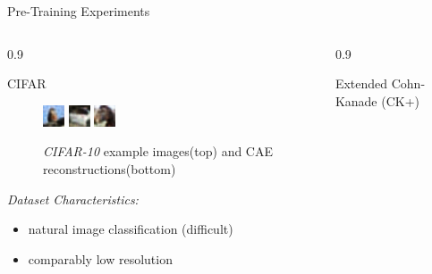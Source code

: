 \documentclass[final]{beamer}
\newlength{\onecolwid}
\newlength{\threecolwid}
\begin{document}
\begin{frame}[t]
\begin{columns}[t]
\begin{column}{\threecolwid}
\begin{alertblock}{Pre-Training Experiments}
\begin{columns}[t, totalwidth=0.9\threecolwid]
\begin{column}{0.9\onecolwid}
\begin{block}{CIFAR}
\begin{figure}
\includegraphics[width=0.2\linewidth]{graphics/reconstructions/cifar/reconstruction_00.png}
\includegraphics[width=0.2\linewidth]{graphics/reconstructions/cifar/reconstruction_01.png}
\includegraphics[width=0.2\linewidth]{graphics/reconstructions/cifar/reconstruction_02.png}

\caption{\emph{CIFAR-10} example images(top) and CAE reconstructions(bottom)}

\end{figure}

\emph{Dataset Characteristics:}\\
\begin{itemize}
\item natural image classification (difficult)
\item comparably low resolution
\end{itemize}
\end{block}
\end{column}

\begin{column}{0.9\onecolwid}
\begin{block}{Extended Cohn-Kanade (CK+)}


\end{block}
\end{column}
\end{columns}
\end{alertblock}
\end{column}
\end{columns}
\end{frame}
\end{document}
